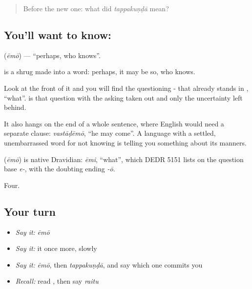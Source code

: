 \label{lesson:TE-C49-perhaps}



\begin{quote}
Before the new one: what did \emph{tappakuṇḍā} mean?
\end{quote}

\subsection*{You'll want to know: }
\textbf{} (\emph{ēmō}) — \textquotedblleft{}perhaps, who knows\textquotedblright{}.

 is a shrug made into a word: perhaps, it may be so, who knows.

Look at the front of it and you will find the questioning - that already stands in , \textquotedblleft{}what\textquotedblright{}.  is that question with the asking taken out and only the uncertainty left behind.

It also hangs on the end of a whole sentence, where English would need a separate clause: \emph{vastāḍēmō}, \textquotedblleft{}he may come\textquotedblright{}. A language with a settled, unembarrassed word for not knowing is telling you something about its manners.

\begin{cousinweb}
\textbf{} (\emph{ēmō}) is native Dravidian: \emph{ēmi}, \textquotedblleft{}what\textquotedblright{}, which DEDR 5151 lists on the question base \emph{e-}, with the doubting ending \emph{-ō}.
\end{cousinweb}

\begin{grammarlens}[title={What you've built}]
Four.
\end{grammarlens}

\subsection*{Your turn}
\begin{itemize}
\raggedright
  \item \emph{Say it:} \emph{ēmō}
  \item \emph{Say it:} it once more, slowly
  \item \emph{Say it:} \emph{ēmō}, then \emph{tappakuṇḍā}, and say which one commits you
  \item \emph{Recall:} read \textbf{}, then say \emph{raitu}
\end{itemize}

